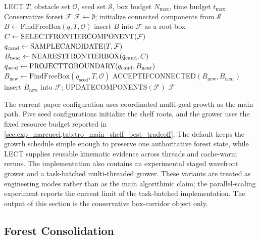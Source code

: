 \documentclass[journal]{IEEEtran}
\DeclareRobustCommand{\textsc}[1]{\textnormal{\MakeUppercase{#1}}}
\newcommand{\calO}{\ensuremath{\mathcal{O}}}
\begin{document}
\begin{algorithm}[t]
\caption{\textsc{GrowForest}---budgeted connected conservative forest expansion}
\label{alg:forest_growth}
\footnotesize
\begin{algorithmic}[1]
\REQUIRE LECT $T$, obstacle set $\calO$, seed set $\mathcal{S}$, box budget $N_{\max}$, time budget $t_{\max}$
\ENSURE Conservative forest $\mathcal{F}$
\STATE $\mathcal{F} \gets \emptyset$; initialize connected components from $\mathcal{S}$
  \STATE $B \gets \text{FindFreeBox}(q, T, \calO)$
    \STATE insert $B$ into $\mathcal{F}$ as a root box
  \ENDIF
\ENDFOR
{}
  \STATE $C \gets \textsc{SelectFrontierComponent}(\mathcal{F})$
  \STATE $q_{\mathrm{cand}} \gets \textsc{SampleCandidate}(T,\mathcal{F})$
  \STATE $B_{\mathrm{near}} \gets \textsc{NearestFrontierBox}(q_{\mathrm{cand}},C)$
  \STATE $q_{\mathrm{seed}} \gets \textsc{ProjectToBoundary}(q_{\mathrm{cand}},B_{\mathrm{near}})$
  \STATE $B_{\mathrm{new}} \gets \text{FindFreeBox}(q_{\mathrm{seed}}, T, \calO)$
    \STATE \textsc{AcceptIfConnected}$(B_{\mathrm{new}},B_{\mathrm{near}})$
    \STATE insert $B_{\mathrm{new}}$ into $\mathcal{F}$; \textsc{UpdateComponents}$(\mathcal{F})$
  \ENDIF
\ENDWHILE
\STATE \RETURN $\mathcal{F}$
\end{algorithmic}
\end{algorithm}

The current paper configuration uses coordinated multi-goal growth as the main
path. Five seed configurations initialize the shelf roots, and the grower uses
the fixed resource budget reported in \cref{sec:exp_marcucci,tab:tro_main_shelf_best_tradeoff}. The default
keeps the growth schedule simple enough to preserve one authoritative forest
state, while LECT supplies reusable kinematic evidence across threads and
cache-warm reruns. The implementation also contains an experimental staged
wavefront grower and a task-batched multi-threaded grower. These variants are
treated as engineering modes rather than as the main algorithmic claim; the
parallel-scaling experiment reports the current limit of the task-batched
implementation. The output of this section is the conservative box-corridor
object only.

\subsection{Forest Consolidation}\label{sec:forest_consolidation}
\end{document}
